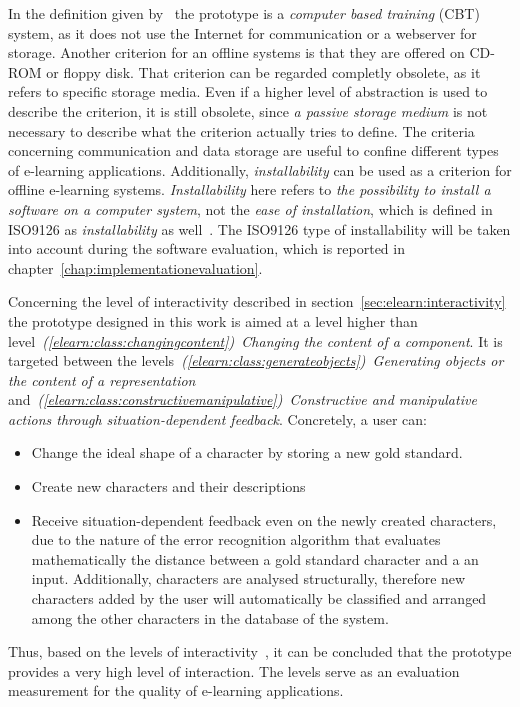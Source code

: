 In the definition given by~ the prototype is a \emph{computer based training} (CBT) system, as it does not use the Internet for 
communication or a webserver for storage. Another criterion for an offline 
systems is that they are offered on CD-ROM or floppy disk.
That criterion can be regarded completly obsolete, as it refers to specific 
storage media. Even if a higher level of abstraction is used to describe the
criterion, it is still obsolete, since \emph{a passive storage medium} is not 
necessary to describe what the criterion actually tries to define.
The criteria concerning communication and data storage are useful to confine
different types of e-learning applications.
Additionally, \emph{installability} can be used as a criterion for offline 
e-learning systems. \emph{Installability} here refers to 
\emph{the possibility to install a software on a computer system}, 
not the \emph{ease of installation}, 
which is defined in ISO9126 as \emph{installability} as 
well~. 
The ISO9126 type of installability will be taken into account during the software
evaluation, which is reported in chapter~\ref{chap:implementationevaluation}.

Concerning the level of interactivity described in 
section~\ref{sec:elearn:interactivity} the prototype designed in this work is 
aimed at a level higher than 
level~\emph{(\ref{elearn:class:changingcontent})~Changing the content of a 
component}. It is targeted between the 
levels~\emph{(\ref{elearn:class:generateobjects})~Generating objects or 
the content of a representation} 
and~\emph{(\ref{elearn:class:constructivemanipulative})~Constructive and 
manipulative actions through situation-dependent feedback}.
Concretely, a user can:
\begin{itemize}
 \item Change the ideal shape of a character by storing a new gold standard.
 \item Create new characters and their descriptions
 \item Receive situation-dependent feedback even on the newly created characters,
       due to the nature of the error recognition algorithm that evaluates
       mathematically the distance between a gold standard character and
       a an input.
       Additionally, characters are analysed structurally, therefore new 
       characters added by the user will automatically be classified and arranged
       among the other characters in the database of the system.
\end{itemize}
Thus, based on the levels of interactivity~,
it can be concluded that the prototype provides a very high level of 
interaction. The levels serve as an evaluation measurement for the quality of 
e-learning applications.

